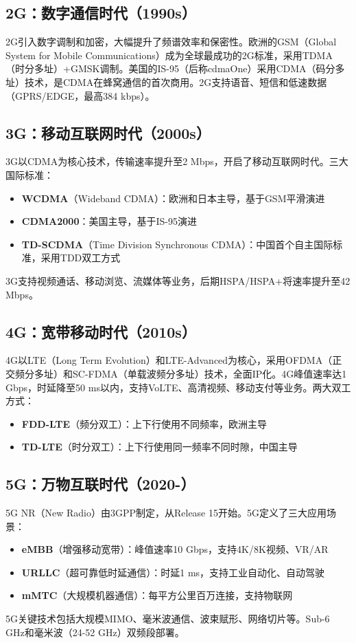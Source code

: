 \documentclass[12pt,UTF8]{ctexbook}
\begin{document}
\subsection{2G：数字通信时代（1990s）}
2G引入数字调制和加密，大幅提升了频谱效率和保密性。欧洲的GSM（Global System for Mobile Communications）成为全球最成功的2G标准，采用TDMA（时分多址）+GMSK调制。美国的IS-95（后称cdmaOne）采用CDMA（码分多址）技术，是CDMA在蜂窝通信的首次商用。2G支持语音、短信和低速数据（GPRS/EDGE，最高384 kbps）。

\subsection{3G：移动互联网时代（2000s）}
3G以CDMA为核心技术，传输速率提升至2 Mbps，开启了移动互联网时代。三大国际标准：
\begin{itemize}[leftmargin=2cm]
    \item \textbf{WCDMA}（Wideband CDMA）：欧洲和日本主导，基于GSM平滑演进
    \item \textbf{CDMA2000}：美国主导，基于IS-95演进
    \item \textbf{TD-SCDMA}（Time Division Synchronous CDMA）：中国首个自主国际标准，采用TDD双工方式
\end{itemize}
3G支持视频通话、移动浏览、流媒体等业务，后期HSPA/HSPA+将速率提升至42 Mbps。

\subsection{4G：宽带移动时代（2010s）}
4G以LTE（Long Term Evolution）和LTE-Advanced为核心，采用OFDMA（正交频分多址）和SC-FDMA（单载波频分多址）技术，全面IP化。4G峰值速率达1 Gbps，时延降至50 ms以内，支持VoLTE、高清视频、移动支付等业务。两大双工方式：
\begin{itemize}[leftmargin=2cm]
    \item \textbf{FDD-LTE}（频分双工）：上下行使用不同频率，欧洲主导
    \item \textbf{TD-LTE}（时分双工）：上下行使用同一频率不同时隙，中国主导
\end{itemize}

\subsection{5G：万物互联时代（2020-）}
5G NR（New Radio）由3GPP制定，从Release 15开始。5G定义了三大应用场景：
\begin{itemize}[leftmargin=2cm]
    \item \textbf{eMBB}（增强移动宽带）：峰值速率10 Gbps，支持4K/8K视频、VR/AR
    \item \textbf{URLLC}（超可靠低时延通信）：时延1 ms，支持工业自动化、自动驾驶
    \item \textbf{mMTC}（大规模机器通信）：每平方公里百万连接，支持物联网
\end{itemize}
5G关键技术包括大规模MIMO、毫米波通信、波束赋形、网络切片等。Sub-6 GHz和毫米波（24-52 GHz）双频段部署。
\end{document}
